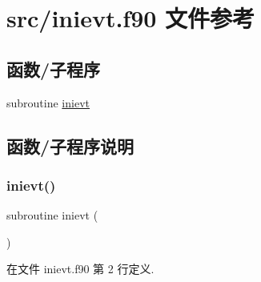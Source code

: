 \hypertarget{inievt_8f90}{}\section{src/inievt.f90 文件参考}
\label{inievt_8f90}
\subsection*{函数/子程序}
\begin{DoxyCompactItemize}
\item 
subroutine \mbox{\hyperlink{inievt_8f90_a10f76393d43ebe5bb556281a70243ce2}{inievt}}
\end{DoxyCompactItemize}


\subsection{函数/子程序说明}
\mbox{\label{inievt_8f90_a10f76393d43ebe5bb556281a70243ce2}} 
\subsubsection{\texorpdfstring{inievt()}{inievt()}}
{\footnotesize\ttfamily subroutine inievt (\begin{DoxyParamCaption}{ }\end{DoxyParamCaption})}



在文件 inievt.\+f90 第 2 行定义.

